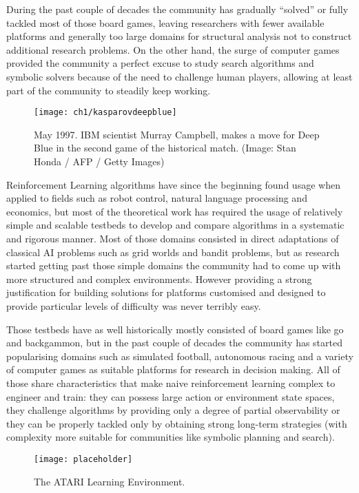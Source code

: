 During the past couple of decades the community has gradually ``solved'' or
fully tackled most of those board games, leaving researchers with fewer
available platforms and generally too large domains for structural analysis not
to construct additional research problems. On the other hand, the surge of
computer games provided the community a perfect excuse to study search
algorithms and symbolic solvers because of the need to challenge human players,
allowing at least part of the community to steadily keep working.

\begin{figure}[h]
    \centering
    \texttt{[image: ch1/kasparovdeepblue]}
    \caption{May 1997. IBM scientist Murray Campbell, makes a move for Deep Blue
      in the second game of the historical match. (Image: Stan Honda / AFP /
      Getty Images)}
    \label{fig:kasparovdeepblue}
\end{figure}

Reinforcement Learning algorithms have since the beginning found usage when
applied to fields such as robot control, natural language processing and
economics, but most of the theoretical work has required the usage of relatively
simple and scalable testbeds to develop and compare algorithms in a systematic
and rigorous manner. Most of those domains consisted in direct adaptations of
classical AI problems such as grid worlds and bandit problems, but as research
started getting past those simple domains the community had to come up with more
structured and complex environments. However providing a strong justification
for building solutions for platforms customised and designed to provide
particular levels of difficulty was never terribly easy.

Those testbeds have as well historically mostly consisted of board games like go
and backgammon, but in the past couple of decades the community has started
popularising domains such as simulated football, autonomous racing and a variety
of computer games as suitable platforms for research in decision making. All of
those share characteristics that make naive reinforcement learning complex to
engineer and train: they can possess large action or environment state spaces,
they challenge algorithms by providing only a degree of partial observability or
they can be properly tackled only by obtaining strong long-term strategies (with
complexity more suitable for communities like symbolic planning and search).

\begin{figure}[h]
    \centering
    \texttt{[image: placeholder]}
    \caption{The ATARI Learning Environment.}
    \label{fig:ALE}
\end{figure}

